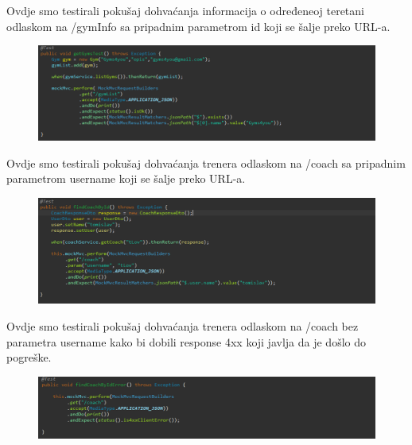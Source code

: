 				
			\noindent {}
			
			Ovdje smo testirali pokušaj dohvaćanja informacija o određeneoj teretani odlaskom na /gymInfo sa pripadnim parametrom id koji se šalje preko URL-a.
             
			\begin{figure}[H]
    			\hspace*{-1.5cm}
    			\includegraphics[scale=0.5]{slike/getGyms.PNG} %
    			\centering
    			\label{fig:promjene}
    	    \end{figure}
	

			\noindent {}
			
			Ovdje smo testirali pokušaj dohvaćanja trenera odlaskom na /coach sa pripadnim parametrom username koji se šalje preko URL-a.

			\begin{figure}[H]
    			\hspace*{-1.5cm}
    			\includegraphics[scale=0.5]{slike/findCoachBy.PNG} %
    			\centering
    			\label{fig:promjene}
    	    \end{figure}
	

				
			\noindent {}
			
			 Ovdje smo testirali pokušaj dohvaćanja trenera odlaskom na /coach bez parametra username kako bi dobili response 4xx koji javlja da je došlo do pogreške.
			\begin{figure}[H]
    			\hspace*{-1.5cm}
    			\includegraphics[scale=0.5]{slike/findCoachByError.PNG} %
    			\centering
    			\label{fig:promjene}
    	    \end{figure}
	

